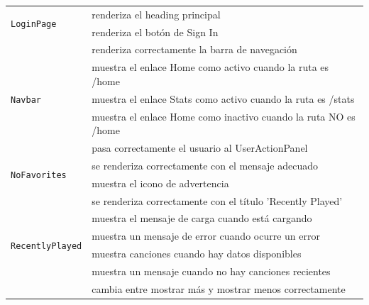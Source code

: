 \begin{longtable}{|p{5cm}|p{9cm}|}
    \multirow{2}{*}{\texttt{LoginPage}}             & renderiza el heading principal                                               \\ \cline{2-2}
                                                    & renderiza el botón de Sign In                                                \\ \hline

    \multirow{5}{*}{\texttt{Navbar}}                & renderiza correctamente la barra de navegación                               \\ \cline{2-2}
                                                    & muestra el enlace Home como activo cuando la ruta es /home                   \\ \cline{2-2}
                                                    & muestra el enlace Stats como activo cuando la ruta es /stats                 \\ \cline{2-2}
                                                    & muestra el enlace Home como inactivo cuando la ruta NO es /home              \\ \cline{2-2}
                                                    & pasa correctamente el usuario al UserActionPanel                             \\ \hline

    \multirow{2}{*}{\texttt{NoFavorites}}           & se renderiza correctamente con el mensaje adecuado                           \\ \cline{2-2}
                                                    & muestra el icono de advertencia                                              \\ \hline

    \multirow{6}{*}{\texttt{RecentlyPlayed}}        & se renderiza correctamente con el título 'Recently Played'                   \\ \cline{2-2}
                                                    & muestra el mensaje de carga cuando está cargando                             \\ \cline{2-2}
                                                    & muestra un mensaje de error cuando ocurre un error                           \\ \cline{2-2}
                                                    & muestra canciones cuando hay datos disponibles                               \\ \cline{2-2}
                                                    & muestra un mensaje cuando no hay canciones recientes                         \\ \cline{2-2}
                                                    & cambia entre mostrar más y mostrar menos correctamente                       \\ \hline


\end{longtable}
